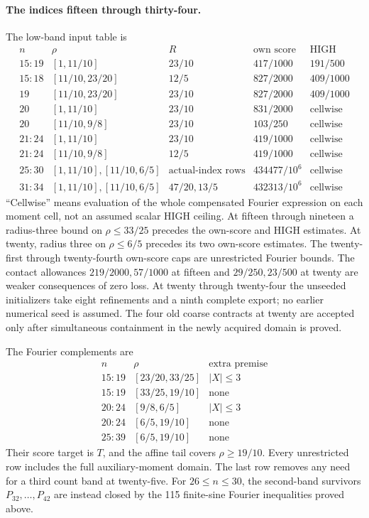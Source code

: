 \paragraph{The indices fifteen through thirty-four.}
The low-band input table is
\[
\begin{array}{c|c|c|c|c}
n&\rho&R&\text{own score}&\text{HIGH}\\\hline
15\!:\!19&[1,11/10]&23/10&417/1000&191/500\\
15\!:\!18&[11/10,23/20]&12/5&827/2000&409/1000\\
19&[11/10,23/20]&23/10&827/2000&409/1000\\
20&[1,11/10]&23/10&831/2000&\text{cellwise}\\
20&[11/10,9/8]&23/10&103/250&\text{cellwise}\\
21\!:\!24&[1,11/10]&23/10&419/1000&\text{cellwise}\\
21\!:\!24&[11/10,9/8]&12/5&419/1000&\text{cellwise}\\
25\!:\!30&[1,11/10],[11/10,6/5]&\text{actual-index rows}&434477/10^6&\text{cellwise}\\
31\!:\!34&[1,11/10],[11/10,6/5]&47/20,13/5&432313/10^6&\text{cellwise}
\end{array}
\]
``Cellwise'' means evaluation of the whole compensated Fourier expression
on each moment cell, not an assumed scalar HIGH ceiling. At fifteen
through nineteen a radius-three bound on $\rho\le33/25$ precedes
the own-score and HIGH estimates. At twenty, radius three on
$\rho\le6/5$ precedes its two own-score estimates. The twenty-first
through twenty-fourth own-score caps are unrestricted Fourier bounds.
The contact allowances $219/2000,57/1000$ at fifteen and
$29/250,23/500$ at twenty are weaker consequences of zero loss.
At twenty through twenty-four the unseeded initializers take eight
refinements and a ninth complete export; no earlier numerical seed is
assumed. The four old coarse contracts at twenty are accepted only after
simultaneous containment in the newly acquired domain is proved.

The Fourier complements are
\[
\begin{array}{c|c|c}
n&\rho&\text{extra premise}\\\hline
15\!:\!19&[23/20,33/25]&|X|\le3\\
15\!:\!19&[33/25,19/10]&\text{none}\\
20\!:\!24&[9/8,6/5]&|X|\le3\\
20\!:\!24&[6/5,19/10]&\text{none}\\
25\!:\!39&[6/5,19/10]&\text{none}
\end{array}
\]
Their score target is $T$, and the affine tail covers $\rho\ge19/10$.
Every unrestricted row includes the full auxiliary-moment domain.
The last row removes any need for a third count band at twenty-five.
For $26\le n\le30$, the second-band survivors $P_{32},\ldots,P_{42}$
are instead closed by the 115 finite-sine Fourier inequalities proved above.

